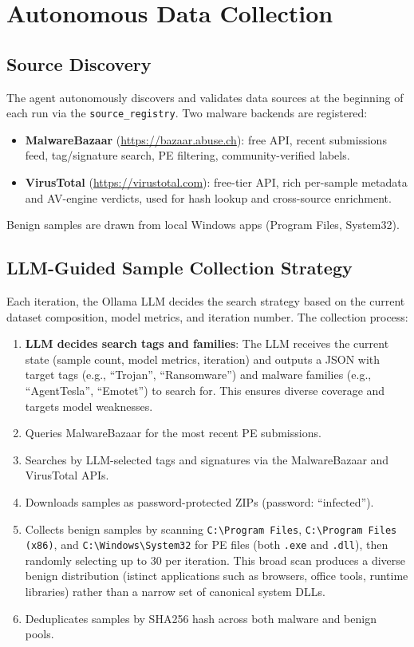 \documentclass[12pt,a4paper]{article}
\begin{document}
\section{Autonomous Data Collection}
\label{sec:data_collection}

\subsection{Source Discovery}

The agent autonomously discovers and validates data sources at the beginning of each run via the \texttt{source\_registry}. Two malware backends are registered:

\begin{itemize}
    \item \textbf{MalwareBazaar} (\url{https://bazaar.abuse.ch}): free API, recent submissions feed, tag/signature search, PE filtering, community-verified labels.
    \item \textbf{VirusTotal} (\url{https://virustotal.com}): free-tier API, rich per-sample metadata and AV-engine verdicts, used for hash lookup and cross-source enrichment.
\end{itemize}

Benign samples are drawn from local Windows apps (Program Files, System32).

\subsection{LLM-Guided Sample Collection Strategy}

Each iteration, the Ollama LLM decides the search strategy based on the current dataset composition, model metrics, and iteration number. The collection process:
\begin{enumerate}
    \item \textbf{LLM decides search tags and families}: The LLM receives the current state (sample count, model metrics, iteration) and outputs a JSON with target tags (e.g., ``Trojan'', ``Ransomware'') and malware families (e.g., ``AgentTesla'', ``Emotet'') to search for. This ensures diverse coverage and targets model weaknesses.
    \item Queries MalwareBazaar for the most recent PE submissions.
    \item Searches by LLM-selected tags and signatures via the MalwareBazaar and VirusTotal APIs.
    \item Downloads samples as password-protected ZIPs (password: ``infected'').
    \item Collects benign samples by scanning \texttt{C:\textbackslash Program Files}, \texttt{C:\textbackslash Program Files (x86)}, and \texttt{C:\textbackslash Windows\textbackslash System32} for PE files (both \texttt{.exe} and \texttt{.dll}), then randomly selecting up to 30 per iteration. This broad scan produces a diverse benign distribution (istinct applications such as browsers, office tools, runtime libraries) rather than a narrow set of canonical system DLLs.
    \item Deduplicates samples by SHA256 hash across both malware and benign pools.
\end{enumerate}
\end{document}
